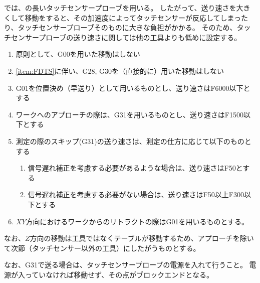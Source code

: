 \clearpage
\DMC では、\WorkTotalLength の長いタッチセンサープローブを用いる。
したがって、送り速さを大きくして移動をすると、その加速度によってタッチセンサーが反応してしまったり、タッチセンサープローブそのものに大きな負担がかかる。
そのため、タッチセンサープローブの送り速さに関しては他の工具よりも低めに設定する。
\begin{enumerate}[label=\Roman*., ref=\Roman*]
\item \label{item:FDTS} 原則として、{\ttfamily G00}を用いた移動はしない
\item \ref{item:FDTS}に伴い、{\ttfamily G28}, {\ttfamily G30}を（直接的に）用いた移動はしない
\item {\ttfamily G01}を位置決め（早送り）として用いるものとし、送り速さは{\ttfamily F6000}以下とする
\item ワークへのアプローチの際は、{\ttfamily G31}を用いるものとし、送り速さは{\ttfamily F1500}以下とする
\item 測定の際のスキップ({\ttfamily G31})の送り速さは、測定の仕方に応じて以下のものとする
  \begin{enumerate}
  \item {}信号遅れ補正を考慮する必要があるような場合は、送り速さは{\ttfamily F50}とする
  \item 信号遅れ補正を考慮する必要がない場合は、送り速さは{\ttfamily F50}以上{\ttfamily F300}以下とする
  \end{enumerate}
\item $XY$方向におけるワークからのリトラクトの際は{\ttfamily G01}を用いるものとする。
\end{enumerate}
なお、$Z$方向の移動は工具ではなくテーブルが移動するため、アプローチを除いて次節（タッチセンサー以外の工具）にしたがうものとする。

なお、{\ttfamily G31}で送る場合は、タッチセンサープローブの電源を入れて行うこと。
電源が入っていなければ移動せず、その点がブロックエンドとなる。



